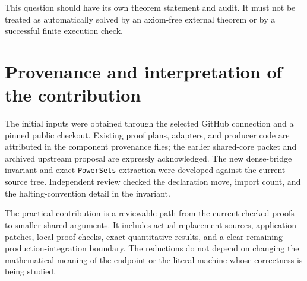\documentclass[11pt]{article}
\begin{document}
This question should have its own theorem statement and audit. It must not be treated as automatically solved by an axiom-free external theorem or by a successful finite execution check.

\section{Provenance and interpretation of the contribution}

The initial inputs were obtained through the selected GitHub connection and a pinned public checkout. Existing proof plans, adapters, and producer code are attributed in the component provenance files; the earlier shared-core packet and archived upstream proposal are expressly acknowledged. The new dense-bridge invariant and exact \texttt{PowerSets} extraction were developed against the current source tree. Independent review checked the declaration move, import count, and the halting-convention detail in the invariant.

The practical contribution is a reviewable path from the current checked proofs to smaller shared arguments. It includes actual replacement sources, application patches, local proof checks, exact quantitative results, and a clear remaining production-integration boundary. The reductions do not depend on changing the mathematical meaning of the endpoint or the literal machine whose correctness is being studied.
\end{document}
